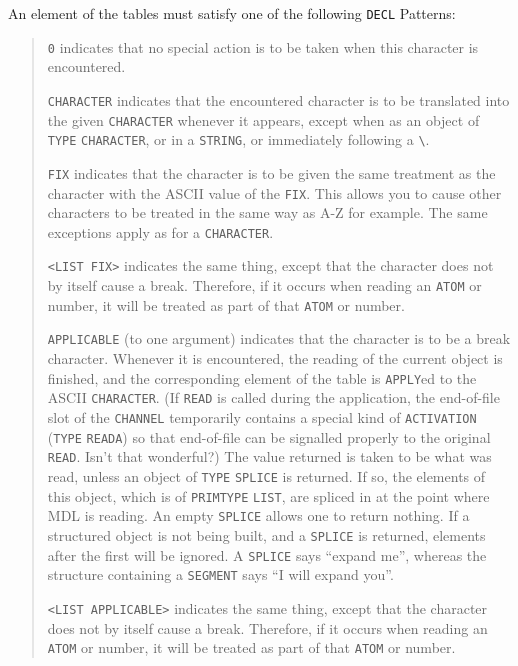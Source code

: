 \documentclass[a4paper]{scrbook}
\begin{document}
An element of the tables must satisfy one of the following \texttt{DECL} Patterns:

\begin{quote}
\texttt{\textquotesingle{}0} indicates that no special action is to be taken when this character is encountered.

\texttt{CHARACTER} indicates that the encountered character is to be translated into the given
\texttt{CHARACTER} whenever it appears, except when as an object of \texttt{TYPE} \texttt{CHARACTER}, or in a
\texttt{STRING}, or immediately following a \texttt{\textbackslash{}}.

\texttt{FIX} indicates that the character is to be given the same treatment as the character with the ASCII value of the
\texttt{FIX}. This allows you to cause other characters to be treated in the same way as A-Z for example. The same
exceptions apply as for a \texttt{CHARACTER}.

\texttt{\textless{}LIST\ FIX\textgreater{}} indicates the same thing, except that the character does not by itself cause a
break. Therefore, if it occurs when reading an \texttt{ATOM} or number, it will be treated as part of that \texttt{ATOM} or
number.

\texttt{APPLICABLE} (to one argument) indicates that the character is to be a break character. Whenever it is encountered,
the reading of the current object is finished, and the corresponding element of the table is \texttt{APPLY}ed to the ASCII
\texttt{CHARACTER}. (If \texttt{READ} is called during the application, the end-of-file slot of the \texttt{CHANNEL}
temporarily contains a special kind of \texttt{ACTIVATION} (\texttt{TYPE} \texttt{READA}) so
that end-of-file can be signalled properly to the original \texttt{READ}. Isn't that wonderful?) The value returned is
taken to be what was read, unless an object of \texttt{TYPE} \texttt{SPLICE} is returned. If
so, the elements of this object, which is of \texttt{PRIMTYPE} \texttt{LIST}, are spliced in at the point where MDL is
reading. An empty \texttt{SPLICE} allows one to return nothing. If a structured object is not being built, and a
\texttt{SPLICE} is returned, elements after the first will be ignored. A \texttt{SPLICE} says ``expand me'', whereas the
structure containing a \texttt{SEGMENT} says ``I will expand you''.

\texttt{\textless{}LIST\ APPLICABLE\textgreater{}} indicates the same thing, except that the character does not by itself
cause a break. Therefore, if it occurs when reading an \texttt{ATOM} or number, it will be treated as part of that
\texttt{ATOM} or number.
\end{quote}
\end{document}
